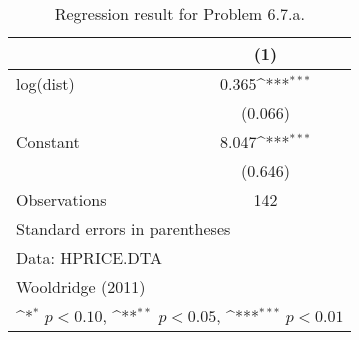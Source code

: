 \begin{table}[htbp]\centering
\def\sym#1{\ifmmode^{#1}\else\(^{#1}\)\fi}
\caption{Regression result for Problem 6.7.a.}
\begin{tabular}{l*{1}{c}}
\toprule
                    &\multicolumn{1}{c}{(1)}         \\
\midrule
log(dist)           &       0.365\sym{***}\\
                    &     (0.066)         \\
\addlinespace
Constant            &       8.047\sym{***}\\
                    &     (0.646)         \\
\midrule
Observations        &         142         \\
\bottomrule
\multicolumn{2}{l}{\footnotesize Standard errors in parentheses}\\
\multicolumn{2}{l}{\footnotesize Data: HPRICE.DTA}\\
\multicolumn{2}{l}{\footnotesize Wooldridge (2011)}\\
\multicolumn{2}{l}{\footnotesize \sym{*} \(p<0.10\), \sym{**} \(p<0.05\), \sym{***} \(p<0.01\)}\\
\end{tabular}
\end{table}
